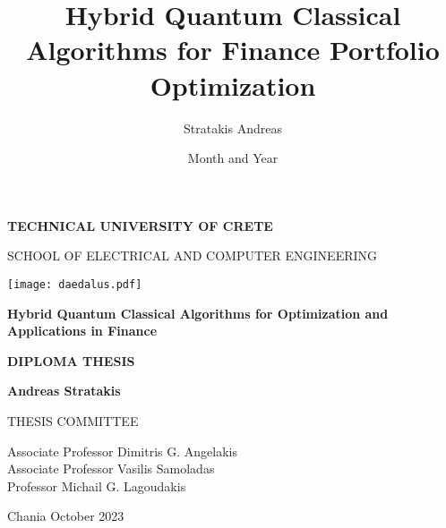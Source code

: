 \documentclass[12pt,a4paper]{report}
\title{Hybrid Quantum Classical Algorithms for Finance Portfolio Optimization}
\author{Stratakis Andreas}
\date{Month and Year}
\begin{document}
\begin{titlepage}
\centering
\vspace*{1cm}

\LARGE
\textbf{TECHNICAL UNIVERSITY OF CRETE}

\vspace{0.5cm}

\large
SCHOOL OF ELECTRICAL AND COMPUTER ENGINEERING

\vspace{0.5cm}

\centering
\texttt{[image: daedalus.pdf]} %

\vspace{0.5cm}

\Huge
\textbf{Hybrid Quantum Classical Algorithms for Optimization and Applications in Finance}

\vspace{1cm}

\Large
\textbf{DIPLOMA THESIS}

\vspace{0.5cm}

\LARGE
\textbf{Andreas Stratakis}

\vspace{1cm}

\large
THESIS COMMITTEE

\vspace{0.5cm}

Associate Professor Dimitris G. Angelakis \\
Associate Professor Vasilis Samoladas \\
Professor Michail G. Lagoudakis

\vspace{1cm}

\Large
Chania October 2023

\end{titlepage}
\end{document}
